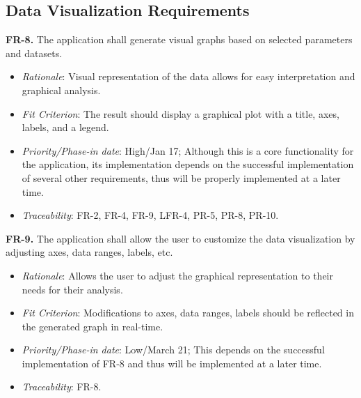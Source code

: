 \documentclass[12pt]{article}
\begin{document}
\subsection{Data Visualization Requirements}
\textbf{FR-8.} The application shall generate visual graphs based on selected parameters and datasets.
  \begin{itemize}
    \item \textit{Rationale}: Visual representation of the data allows for easy interpretation and graphical analysis.
    \item \textit{Fit Criterion}: The result should display a graphical plot with a title, axes, labels, and a legend.
    \item \textit{Priority/Phase-in date}: High/Jan 17; Although this is a core functionality for the application, its implementation depends on the successful implementation of several other requirements, thus will be properly implemented at a later time.
    \item \textit{Traceability}: FR-2, FR-4, FR-9, LFR-4, PR-5, PR-8, PR-10.
  \end{itemize}
\textbf{FR-9.} The application shall allow the user to customize the data visualization by adjusting axes, data ranges, labels, etc.
  \begin{itemize}
    \item \textit{Rationale}: Allows the user to adjust the graphical representation to their needs for their analysis.
    \item \textit{Fit Criterion}: Modifications to axes, data ranges, labels should be reflected in the generated graph in real-time.
    \item \textit{Priority/Phase-in date}: Low/March 21; This depends on the successful implementation of FR-8 and thus will be implemented at a later time.
    \item \textit{Traceability}: FR-8.
  \end{itemize}
\end{document}
